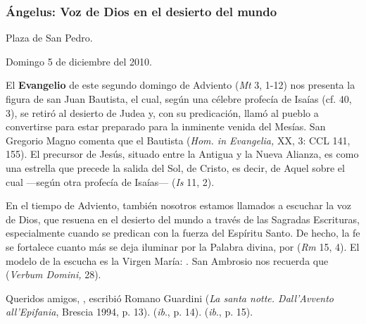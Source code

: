 \subsubsection{Ángelus: Voz de Dios en el desierto del mundo}

Plaza de San Pedro.

Domingo 5 de diciembre del 2010.

\begin{body}		
	El \textbf{Evangelio} de este segundo domingo de Adviento (\emph{Mt} 3, 1-12) nos presenta la figura de san Juan Bautista, el cual, según una célebre profecía de Isaías (cf. 40, 3), se retiró al desierto de Judea y, con su predicación, llamó al pueblo a convertirse para estar preparado para la inminente venida del Mesías. San Gregorio Magno comenta que el Bautista  (\emph{Hom. in Evangelia,} XX, 3: CCL 141, 155). El precursor de Jesús, situado entre la Antigua y la Nueva Alianza, es como una estrella que precede la salida del Sol, de Cristo, es decir, de Aquel sobre el cual ---según otra profecía de Isaías---  (\emph{Is} 11, 2).
	
	En el tiempo de Adviento, también nosotros estamos llamados a escuchar la voz de Dios, que resuena en el desierto del mundo a través de las Sagradas Escrituras, especialmente cuando se predican con la fuerza del Espíritu Santo. De hecho, la fe se fortalece cuanto más se deja iluminar por la Palabra divina, por  (\emph{Rm} 15, 4). El modelo de la escucha es la Virgen María: . San Ambrosio nos recuerda que  (\emph{Verbum Domini,} 28).
	
	Queridos amigos, , escribió Romano Guardini (\emph{La santa notte. Dall'Avvento all'Epifania}, Brescia 1994, p. 13).  (\emph{ib}., p. 14).  (\emph{ib}., p. 15).
	

\end{body}
